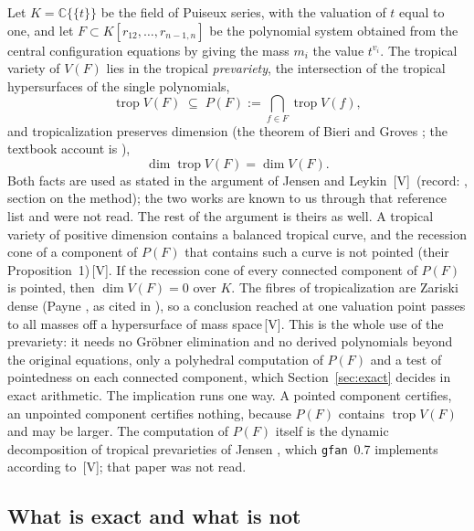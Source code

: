 \documentclass[11pt]{article}
\theoremstyle{definition}
\theoremstyle{remark}
\newcommand{\mk}[1]{\,{\scriptsize[#1]}}
\newcommand{\Vm}{\mk{V}}
\begin{document}
Let $K=\mathbb{C}\{\{t\}\}$ be the field of Puiseux series, with the valuation of $t$ equal to one, and let
$F\subset K[r_{12},\dots,r_{n-1,n}]$ be the polynomial system obtained from the central configuration
equations by giving the mass $m_i$ the value $t^{v_i}$. The tropical variety of $V(F)$ lies in the tropical
\emph{prevariety}, the intersection of the tropical hypersurfaces of the single polynomials,
\begin{equation}\label{eq:prevar}
\operatorname{trop}V(F)\;\subseteq\;P(F):=\bigcap_{f\in F}\operatorname{trop}V(f),
\end{equation}
and tropicalization preserves dimension (the theorem of Bieri and Groves \cite{BG84}; the textbook account is
\cite{MS15}),
\begin{equation}\label{eq:bg}
\dim\operatorname{trop}V(F)=\dim V(F).
\end{equation}
Both facts are used as stated in the argument of Jensen and Leykin \cite{JL25}\Vm\ (record:
, section on the method); %
the two works \cite{BG84,MS15} are known to us through that reference list and were not read. The rest of the argument is theirs
as well. A tropical variety of positive dimension contains a balanced tropical curve, and the recession cone of
a component of $P(F)$ that contains such a curve is not pointed (their Proposition~1)\Vm. If the recession cone
of every connected component of $P(F)$ is pointed, then $\dim V(F)=0$ over $K$. The fibres of tropicalization are
Zariski dense (Payne \cite{Payne09}, as cited in \cite{JL25}), so a conclusion reached at one valuation point
passes to all masses off a hypersurface of mass space\Vm. This is the whole use of the prevariety: it needs no
Gr\"obner elimination and no derived polynomials beyond the original equations, only a polyhedral computation of
$P(F)$ and a test of pointedness on each connected component, which Section~\ref{sec:exact} decides in exact
arithmetic. The implication runs one way. A pointed component certifies, an unpointed component certifies
nothing, because $P(F)$ contains $\operatorname{trop}V(F)$ and may be larger. The computation of $P(F)$ itself is
the dynamic decomposition of tropical prevarieties of Jensen \cite{Jensen24}, which \texttt{gfan}~0.7 implements
according to \cite{JL25}\Vm; that paper was not read.

\subsection{What is exact and what is not}\label{sec:exactnot}
\end{document}
